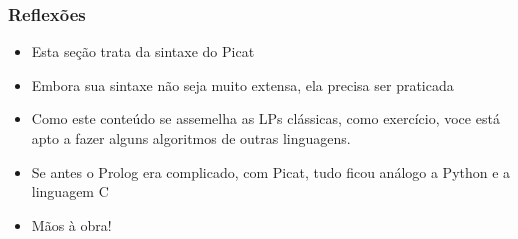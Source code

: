 \begin{frame}[fragile]
\frametitle{Reflexões}

\begin{itemize}


  \item Esta seção  trata da sintaxe do Picat
  
    \pause
  \item Embora sua sintaxe não seja muito extensa, ela precisa 
  ser praticada
  
    \pause
  \item Como este conteúdo se assemelha as LPs clássicas, como exercício,
  voce está apto a fazer alguns algoritmos de outras linguagens.

  \pause
  \item Se antes o Prolog era complicado, com Picat,
  tudo ficou análogo a Python e a linguagem C

  
  \pause
  \item Mãos à obra!
 
\end{itemize}

\end{frame}
